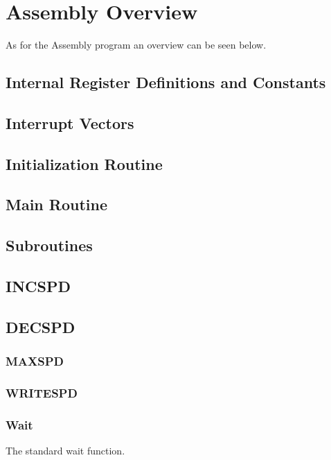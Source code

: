 \documentclass[12pt,letterpaper]{article}
\begin{document}
\section{Assembly Overview}
As for the Assembly program an overview can be seen below. 

\subsection{Internal Register Definitions and Constants}


\subsection{Interrupt Vectors}




\subsection{Initialization Routine}


\subsection{Main Routine}



\subsection{Subroutines}
	\subsection{INCSPD}
	
	
	\subsection{DECSPD}
	

	\subsubsection{MAXSPD}

	 
	
	\subsubsection{WRITESPD}

	
	\subsubsection{Wait}
	The standard wait function.
	
\end{document}
